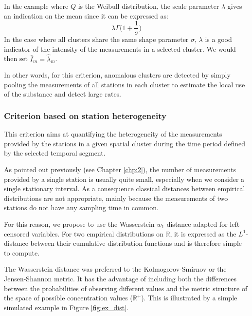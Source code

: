 In the example where $Q$ is the Weibull distribution, the scale parameter $\lambda$ gives an indication on the mean since it can be expressed as: 
\begin{equation}
\lambda\Gamma\bigg(1+\frac{1}{\sigma}\bigg)
\end{equation}
In the case where all clusters share the same shape parameter $\sigma$, $\lambda$ is a good indicator of the intensity of the measurements in a selected cluster. We would then set $\bar{I}_m = \widehat{\lambda}_m$.

In other words, for this criterion, anomalous clusters are detected by simply pooling the measurements of all stations in each cluster to estimate the local use of the substance and detect large rates. 


\subsubsection{Criterion based on station heterogeneity}

This criterion aims at quantifying the heterogeneity of the measurements provided by the stations in a given spatial cluster during the time period defined by the selected temporal segment.

As pointed out previously (see Chapter \ref{chp:2}), the number of measurements provided by a single station is usually quite small, especially when we consider a single stationary interval. As a consequence classical distances between empirical distributions are not appropriate, mainly because the measurements of two stations do not have any sampling time in common. 

For this reason, we propose to use the Wasserstein $w_1$ distance \citep{villani2009optimal} adapted for left censored variables. For two empirical distributions on $\mathbb{R}$, it is expressed as the $L^1$-distance between their cumulative distribution functions and is therefore simple to compute. 

The Wasserstein distance was preferred to the Kolmogorov-Smirnov or the Jensen-Shannon metric. It has the advantage of including both the differences between the probabilities of observing different values and the metric structure of the space of possible concentration values ($\mathbb{R}^+$). 
This is illustrated by a simple simulated example in Figure \ref{fig:ex_dist}.


